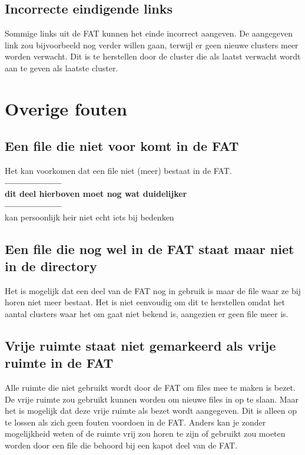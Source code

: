 \documentclass[11pt]{article}
\begin{document}
	\subsection{Incorrecte eindigende links}\label{sec:links}
	Sommige links uit de FAT kunnen het einde incorrect aangeven. De aangegeven link zou bijvoorbeeld nog verder willen gaan, terwijl er geen nieuwe clusters meer worden verwacht. Dit is te herstellen door de cluster die als laatst verwacht wordt aan te geven als laatste cluster.

	\newpage

	\section{Overige fouten}\label{sec:overige}
	\subsection{Een file die niet voor komt in de FAT}\label{sec:dir}
	Het kan voorkomen dat een file niet (meer) bestaat in de FAT.\\
\textbf{------------------\\dit deel hierboven moet nog wat duidelijker \\------------------}\\
kan persoonlijk heir niet echt iets bij bedenken 

	\subsection{Een file die nog wel in de FAT staat maar niet in de directory}\label{sec:fat}
	Het is mogelijk dat een deel van de FAT nog in gebruik is maar de file waar ze bij horen niet meer bestaat. Het is niet eenvoudig om dit te herstellen omdat het aantal clusters waar het om gaat niet bekend is, aangezien er geen file meer is.

	\subsection{Vrije ruimte staat niet gemarkeerd als vrije ruimte in de FAT}\label{sec:vrij}
	Alle ruimte die niet gebruikt wordt door de FAT om files mee te maken is bezet. De vrije ruimte zou gebruikt kunnen worden om nieuwe files in op te slaan. Maar het is mogelijk dat deze vrije ruimte als bezet wordt aangegeven. Dit is alleen op te lossen als zich geen fouten voordoen in de FAT. Anders kan je zonder mogelijkheid weten of de ruimte vrij zou horen te zijn of gebruikt zou moeten worden door een file die behoord bij een kapot deel van de FAT.
\end{document}
